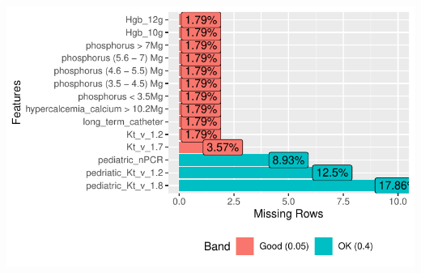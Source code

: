 \documentclass[
  letterpaper,
  DIV=11,
  numbers=noendperiod]{scrreprt}
\begin{document}
\includegraphics{dataset_files/figure-pdf/unnamed-chunk-5-2.pdf}
\end{document}
